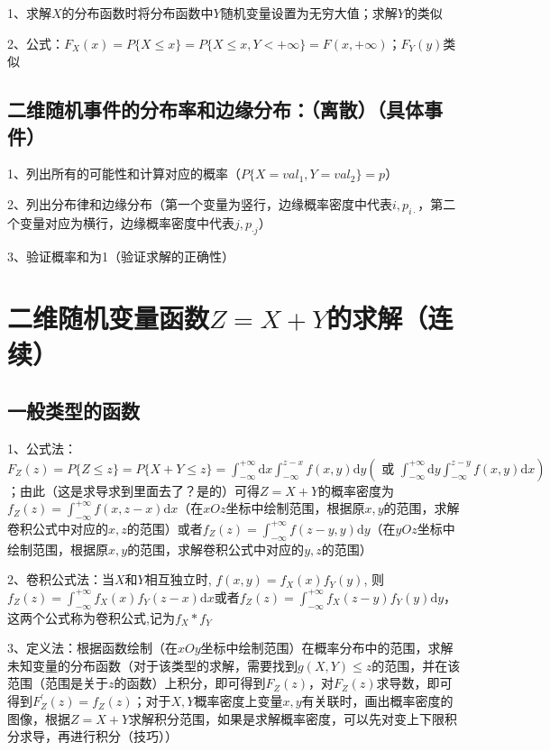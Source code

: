 1、求解$X$的分布函数时将分布函数中$Y$随机变量设置为无穷大值；求解$Y$的类似

2、公式：$F_X(x)=P\{X \le x\} = P\{X \le x,Y<+\infty\} = F(x, +\infty)$；$F_Y(y)$类似



\subsection{二维随机事件的分布率和边缘分布：（离散）（具体事件）}

1、列出所有的可能性和计算对应的概率（$P\{X=val_1,Y=val_2\} = p$）

2、列出分布律和边缘分布（第一个变量为竖行，边缘概率密度中代表$i,p_{i\cdot}$，第二个变量对应为横行，边缘概率密度中代表$j,p_{\cdot j}$）

3、验证概率和为1（验证求解的正确性）

\section{二维随机变量函数$Z=X+Y$的求解（连续）}



\subsection{一般类型的函数}

1、公式法：$F_{Z}(z)=P\{Z \leqslant z\}=P\{X+Y \leqslant z\}=\int_{-\infty}^{+\infty} \mathrm{d} x \int_{-\infty}^{z-x} f(x, y) \mathrm{d} y\left(\text { 或 } \int_{-\infty}^{+\infty} \mathrm{d} y \int_{-\infty}^{z-y} f(x, y) \mathrm{d} x\right)$；由此（这是求导求到里面去了？是的）可得$Z=X+Y$的概率密度为$f_{Z}(z)=\int_{-\infty}^{+\infty} f(x, z-x) \mathrm{d} x$（在$xOz$坐标中绘制范围，根据原$x,y$的范围，求解卷积公式中对应的$x,z$的范围）或者$f_{Z}(z)=\int_{-\infty}^{+\infty} f(z-y, y) \mathrm{d} y$（在$yOz$坐标中绘制范围，根据原$x,y$的范围，求解卷积公式中对应的$y,z$的范围）

2、卷积公式法：当$X$和$Y$相互独立时, $f(x, y)=f_{X}(x) f_{Y}(y)$, 则$f_{Z}(z)=\int_{-\infty}^{+\infty} f_{X}(x) f_{Y}(z-x) \mathrm{d} x$或者$f_{Z}(z)=\int_{-\infty}^{+\infty} f_{X}(z-y) f_{Y}(y) \mathrm{d} y$，这两个公式称为卷积公式,记为$f_{X} * f_{Y}$

3、定义法：根据函数绘制（在$xOy$坐标中绘制范围）在概率分布中的范围，求解未知变量的分布函数（对于该类型的求解，需要找到$g(X, Y) \leqslant z$的范围，并在该范围（范围是关于$z$的函数）上积分，即可得到$F_{Z}(z)$，对$F_{Z}(z)$求导数，即可得到$F_{Z}^{'}(z)=f_{Z}(z)$；对于$X,Y$概率密度上变量$x,y$有关联时，画出概率密度的图像，根据$Z=X+Y$求解积分范围，如果是求解概率密度，可以先对变上下限积分求导，再进行积分（技巧））

